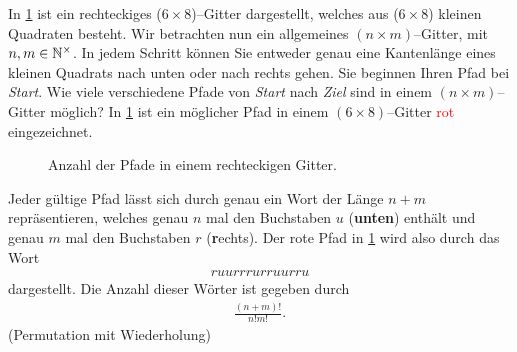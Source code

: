 \begin{questions}
\question[2] In \cref{fig:gitter} ist ein rechteckiges ($6\times 8$)--Gitter dargestellt, welches aus ($6\times 8$) kleinen Quadraten besteht. Wir betrachten nun ein allgemeines $(n\times m)$--Gitter, mit $n,m\in\mathbb{N}^{\times}$. In jedem Schritt können Sie entweder genau eine Kantenlänge eines kleinen Quadrats nach unten oder nach rechts gehen. Sie beginnen Ihren Pfad bei \textit{Start}. Wie viele verschiedene Pfade von \textit{Start} nach \textit{Ziel} sind in einem $(n\times m)$--Gitter möglich? In \cref{fig:gitter} ist ein möglicher Pfad in einem $(6\times 8)$--Gitter \textcolor{red}{rot} eingezeichnet.
\begin{figure}[H]
    \centering
    \caption{Anzahl der Pfade in einem rechteckigen Gitter.}
    \label{fig:gitter}
\end{figure}
\begin{solution}
Jeder gültige Pfad lässt sich durch genau ein Wort der Länge $n+m$ repräsentieren, welches genau $n$ mal den Buchstaben $u$ (\textbf{unten}) enthält und genau $m$ mal den Buchstaben $r$ (\textbf{r}echts). Der rote Pfad in \cref{fig:gitter} wird also durch das Wort
\begin{align*}
    ruurrrurruurru
\end{align*}
dargestellt. Die Anzahl dieser Wörter ist gegeben durch
\begin{align*}
    \frac{(n+m)!}{n!m!}.
\end{align*}
(Permutation mit Wiederholung)
\end{solution}
\end{questions}